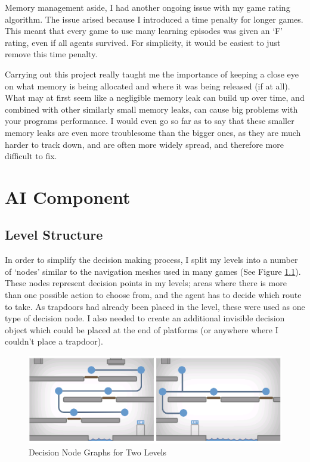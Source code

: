 \documentclass[a4paper,oneside]{report}
\begin{document}
Memory management aside, I had another ongoing issue with my game rating algorithm. The issue arised because I introduced a time penalty for longer games. This meant that every game to use many learning episodes was given an `F' rating, even if all agents survived. For simplicity, it would be easiest to just remove this time penalty. 

Carrying out this project really taught me the importance of keeping a close eye on what memory is being allocated and where it was being released (if at all). What may at first seem like a negligible memory leak can build up over time, and combined with other similarly small memory leaks, can cause big problems with your programs performance. I would even go so far as to say that these smaller memory leaks are even more troublesome than the bigger ones, as they are much harder to track down, and are often more widely spread, and therefore more difficult to fix.

\chapter{AI Component}

\section{Level Structure}

In order to simplify the decision making process, I split my levels into a number of `nodes' similar to the navigation meshes used in many games (See Figure \ref{fig:LevelNodes}). These nodes represent decision points in my levels; areas where there is more than one possible action to choose from, and the agent has to decide which route to take. As trapdoors had already been placed in the level, these were used as one type of decision node. I also needed to create an additional invisible decision object which could be placed at the end of platforms (or anywhere where I couldn't place a trapdoor). 

\begin{figure}[h!]
  \centering
    \includegraphics[width=140mm]{sources/images/LevelNodes}
    \caption{Decision Node Graphs for Two Levels}
    \label{fig:LevelNodes}
\end{figure}
\end{document}
